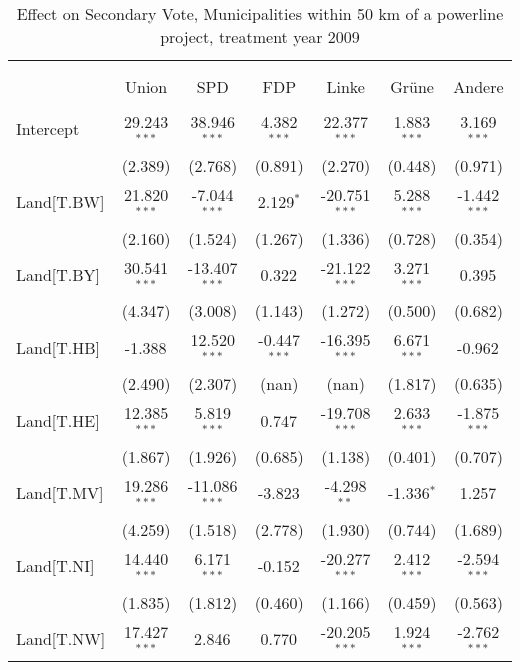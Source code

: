 \begin{table}[!htbp] \centering
  \caption{Effect on Secondary Vote, Municipalities within 50 km of a powerline project, treatment year 2009}
\begin{tabular}{@{\extracolsep{5pt}}lcccccc}
\\[-1.8ex]\hline
\hline \\[-1.8ex]
\\[-1.8ex] & \multicolumn{1}{c}{Union} & \multicolumn{1}{c}{SPD} & \multicolumn{1}{c}{FDP} & \multicolumn{1}{c}{Linke} & \multicolumn{1}{c}{Grüne} & \multicolumn{1}{c}{Andere}  \\
\hline \\[-1.8ex]
 Intercept & 29.243$^{***}$ & 38.946$^{***}$ & 4.382$^{***}$ & 22.377$^{***}$ & 1.883$^{***}$ & 3.169$^{***}$ \\
  & (2.389) & (2.768) & (0.891) & (2.270) & (0.448) & (0.971) \\
 Land[T.BW] & 21.820$^{***}$ & -7.044$^{***}$ & 2.129$^{*}$ & -20.751$^{***}$ & 5.288$^{***}$ & -1.442$^{***}$ \\
  & (2.160) & (1.524) & (1.267) & (1.336) & (0.728) & (0.354) \\
 Land[T.BY] & 30.541$^{***}$ & -13.407$^{***}$ & 0.322$^{}$ & -21.122$^{***}$ & 3.271$^{***}$ & 0.395$^{}$ \\
  & (4.347) & (3.008) & (1.143) & (1.272) & (0.500) & (0.682) \\
 Land[T.HB] & -1.388$^{}$ & 12.520$^{***}$ & -0.447$^{***}$ & -16.395$^{***}$ & 6.671$^{***}$ & -0.962$^{}$ \\
  & (2.490) & (2.307) & (nan) & (nan) & (1.817) & (0.635) \\
 Land[T.HE] & 12.385$^{***}$ & 5.819$^{***}$ & 0.747$^{}$ & -19.708$^{***}$ & 2.633$^{***}$ & -1.875$^{***}$ \\
  & (1.867) & (1.926) & (0.685) & (1.138) & (0.401) & (0.707) \\
 Land[T.MV] & 19.286$^{***}$ & -11.086$^{***}$ & -3.823$^{}$ & -4.298$^{**}$ & -1.336$^{*}$ & 1.257$^{}$ \\
  & (4.259) & (1.518) & (2.778) & (1.930) & (0.744) & (1.689) \\
 Land[T.NI] & 14.440$^{***}$ & 6.171$^{***}$ & -0.152$^{}$ & -20.277$^{***}$ & 2.412$^{***}$ & -2.594$^{***}$ \\
  & (1.835) & (1.812) & (0.460) & (1.166) & (0.459) & (0.563) \\
 Land[T.NW] & 17.427$^{***}$ & 2.846$^{}$ & 0.770$^{}$ & -20.205$^{***}$ & 1.924$^{***}$ & -2.762$^{***}$ \\

\end{tabular}
\end{table}
